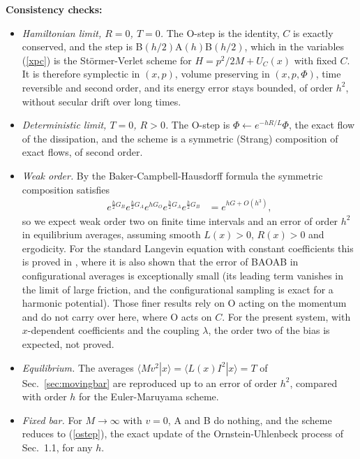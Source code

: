 \documentclass[11pt]{article}
\begin{document}
{\bf Consistency checks:}
\begin{itemize}
\item {\it Hamiltonian limit, $R=0$, $T=0$.} The O-step is the identity, $C$ is exactly conserved, and the step is B$(h/2)$A$(h)$B$(h/2)$, which in the variables (\ref{xpc}) is the St\"ormer-Verlet scheme for $H=p^2/2M+U_C(x)$ with fixed $C$. It is therefore symplectic in $(x,p)$, volume preserving in $(x,p,\Phi)$, time reversible and second order, and its energy error stays bounded, of order $h^2$, without secular drift over long times.
\item {\it Deterministic limit, $T=0$, $R>0$.} The O-step is $\Phi\leftarrow e^{-hR/L}\Phi$, the exact flow of the dissipation, and the scheme is a symmetric (Strang) composition of exact flows, of second order.
\item {\it Weak order.} By the Baker-Campbell-Hausdorff formula the symmetric composition satisfies
  \begin{align}
    e^{\frac{h}{2}G_B}e^{\frac{h}{2}G_A}e^{hG_O}e^{\frac{h}{2}G_A}e^{\frac{h}{2}G_B}&=e^{hG+O(h^3)},
  \end{align}
  so we expect weak order two on finite time intervals and an error of order $h^2$ in equilibrium averages, assuming smooth $L(x)>0$, $R(x)>0$ and ergodicity. For the standard Langevin equation with constant coefficients this is proved in \cite{leimkuhler}, where it is also shown that the error of BAOAB in configurational averages is exceptionally small (its leading term vanishes in the limit of large friction, and the configurational sampling is exact for a harmonic potential). Those finer results rely on O acting on the momentum and do not carry over here, where O acts on $C$. For the present system, with $x$-dependent coefficients and the coupling $\lambda$, the order two of the bias is expected, not proved.
\item {\it Equilibrium.} The averages $\langle Mv^2|x\rangle=\langle L(x)I^2|x\rangle=T$ of Sec.~\ref{sec:movingbar} are reproduced up to an error of order $h^2$, compared with order $h$ for the Euler-Maruyama scheme.
\item {\it Fixed bar.} For $M\to\infty$ with $v=0$, A and B do nothing, and the scheme reduces to (\ref{ostep}), the exact update of the Ornstein-Uhlenbeck process of Sec.~1.1, for any $h$.
\end{itemize}
\end{document}
